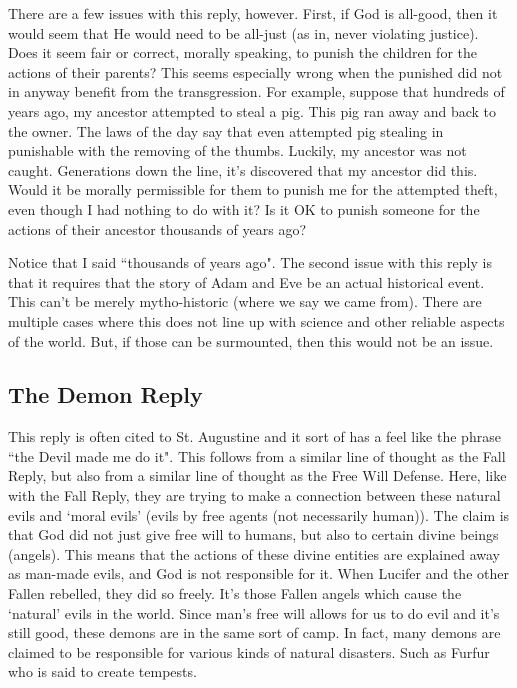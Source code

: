 There are a few issues with this reply, however. First, if God is all-good, then it would seem that He would need to be all-just (as in, never violating justice). Does it seem fair or correct, morally speaking, to punish the children for the actions of their parents? This seems especially wrong when the punished did not in anyway benefit from the transgression. For example, suppose that hundreds of years ago, my ancestor attempted to steal a pig. This pig ran away and back to the owner. The laws of the day say that even attempted pig stealing in punishable with the removing of the thumbs. Luckily, my ancestor was not caught. Generations down the line, it's discovered that my ancestor did this. Would it be morally permissible for them to punish me for the attempted theft, even though I had nothing to do with it? Is it OK to punish someone for the actions of their ancestor thousands of years ago?

Notice that I said ``thousands of years ago". The second issue with this reply is that it requires that the story of Adam and Eve be an actual historical event. This can't be merely mytho-historic (where we say we came from). There are multiple cases where this does not line up with science and other reliable aspects of the world. But, if those can be surmounted, then this would not be an issue.
\subsection{The Demon Reply}

This reply is often cited to St. Augustine and it sort of has a feel like the phrase ``the Devil made me do it". This follows from a similar line of thought as the Fall Reply, but also from a similar line of thought as the Free Will Defense. Here, like with the Fall Reply, they are trying to make a connection between these natural evils and `moral evils' (evils by free agents (not necessarily human)). The claim is that God did not just give free will to humans, but also to certain divine beings (angels). This means that the actions of these divine entities are explained away as man-made evils, and God is not responsible for it. When Lucifer and the other Fallen rebelled, they did so freely. It's those Fallen angels which cause the `natural' evils in the world.  Since man's free will allows for us to do evil and it's still good, these demons are in the same sort of camp. In fact, many demons are claimed to be responsible for various kinds of natural disasters.  Such as Furfur who is said to create tempests.

